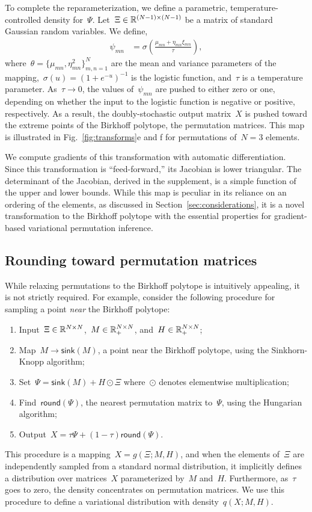 \documentclass[twoside]{article}
\begin{document}
To complete the reparameterization, we define a parametric,
temperature-controlled density for~$\Psi$.
Let~${\Xi \in \mathbb{R}^{(N-1) \times (N-1)}}$ be a matrix of standard
Gaussian random variables.  We
define,
\begin{align*}
  \psi_{mn} &= \sigma\left( \frac{\mu_{mn} + \eta_{mn} \xi_{mn}}{\tau} \right),
\end{align*}
where~${\theta = \{\mu_{mn}, \eta^2_{mn}\}_{m,n=1}^N}$ are the mean
and variance parameters of the
mapping,~${\sigma(u) = (1+e^{-u})^{-1}}$ is the logistic function,
and~$\tau$ is a temperature parameter. As~$\tau \to 0$, the values
of~$\psi_{mn}$ are pushed to either zero or one, depending on whether
the input to the logistic function is negative or positive,
respectively.  As a result, the doubly-stochastic output matrix~$X$ is
pushed toward the extreme points of the Birkhoff polytope, the
permutation matrices.  This map is illustrated in
Fig.~\ref{fig:transforms}e and f for permutations of~${N=3}$
elements.

We compute gradients of this transformation with automatic
differentiation.  Since this transformation is ``feed-forward,'' its
Jacobian is lower triangular. The determinant of the Jacobian, derived
in the supplement, is a simple function of the upper and lower bounds.
While this map is peculiar in its reliance on an ordering of the
elements, as discussed in Section~\ref{sec:considerations}, it is a
novel transformation to the Birkhoff polytope with the essential
properties for gradient-based variational permutation inference.

\subsection{Rounding toward permutation matrices}
\label{sub:rounding}

While relaxing permutations to the Birkhoff polytope is intuitively
appealing, it is not strictly required.  For example, consider the
following procedure for sampling a point \emph{near} the Birkhoff
polytope:
\begin{enumerate}[label=(\roman*)]
\item Input~${\Xi \in \mathbb{R}^{N \times N}}$,~${M \in \mathbb{R}_+^{N \times N}}$, and~${H \in \mathbb{R}_+^{N \times N}}$;
\item Map~$M \to \mathsf{sink}(M)$, a point near the Birkhoff polytope, using the Sinkhorn-Knopp algorithm;
\item Set~${\Psi = \mathsf{sink}(M) + H \odot \Xi}$ where~$\odot$ denotes elementwise multiplication;
\item Find~$\mathsf{round}(\Psi)$, the nearest permutation matrix to~$\Psi$, using the Hungarian algorithm;
\item Output~${X = \tau \Psi + (1-\tau) \mathsf{round}(\Psi)}$.
\end{enumerate}
This procedure is a mapping~$X = g(\Xi; M, H)$, and when the elements
of~$\Xi$ are independently sampled from a standard normal distribution,
it implicitly defines a distribution over matrices~$X$ parameterized
by~$M$ and~$H$. Furthermore, as~$\tau$ goes to zero, the density
concentrates on permutation matrices.  We use this procedure to define
a variational distribution with density~$q(X; M, H)$.
\end{document}
